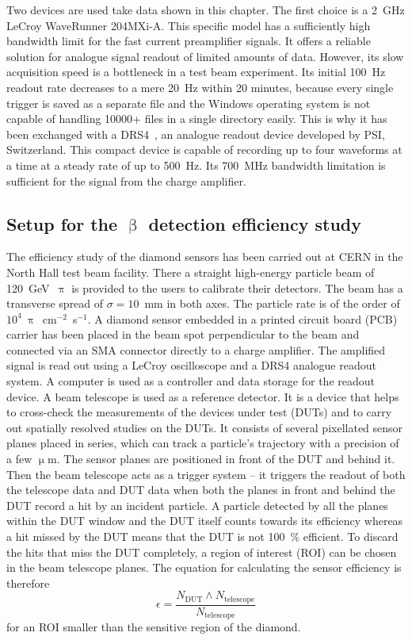 Two devices are used take data shown in this chapter. The first choice is a 2~GHz LeCroy WaveRunner 204MXi-A. This specific model has a sufficiently high bandwidth limit for the fast current preamplifier signals. It offers a reliable solution for analogue signal readout of limited amounts of data. However, its slow acquisition speed is a bottleneck in a test beam experiment. Its initial 100~Hz readout rate decreases to a mere 20~Hz within 20 minutes, because every single trigger is saved as a separate file and the Windows operating system is not capable of handling 10000+ files in a single directory easily. This is why it has been exchanged with a DRS4~\cite{DRS4:00000}, an analogue readout device developed by PSI, Switzerland. This compact device is capable of recording up to four waveforms at a time at a steady rate of up to 500~Hz. Its 700~MHz bandwidth limitation is sufficient for the signal from the charge amplifier.



\subsection{Setup for the $\upbeta$ detection efficiency study}
The efficiency study of the diamond sensors has been carried out at CERN in the North Hall test beam facility. There a straight high-energy particle beam of 120~GeV~$\uppi$ is provided to the users to calibrate their detectors. The beam has a transverse spread of $\sigma=10$~mm in both axes. The particle rate is of the order of $10^4~\uppi$~cm$^{-2}$~s$^{-1}$. A diamond sensor embedded in a printed circuit board (PCB) carrier has been placed in the beam spot perpendicular to the beam and connected via an SMA connector directly to a charge amplifier. The amplified signal is read out using a LeCroy oscilloscope and a DRS4 analogue readout system. A computer is used as a controller and data storage for the readout device. A beam telescope is used as a reference detector. It is a device that helps to cross-check the measurements of the devices under test (DUTs) and to carry out spatially resolved studies on the DUTs. It consists of several pixellated sensor planes placed in series, which can track a particle's trajectory with a precision of a few $\upmu$m. The sensor planes are positioned in front of the DUT and behind it. Then the beam telescope acts as a trigger system -- it triggers the readout of both the telescope data and DUT data when both the planes in front and behind the DUT record a hit by an incident particle. A particle detected by all the planes within the DUT window and the DUT itself counts towards its efficiency whereas a hit missed by the DUT means that the DUT is not 100~\% efficient. To discard the hits that miss the DUT completely, a region of interest (ROI) can be chosen in the beam telescope planes. The equation for calculating the sensor efficiency is therefore
\begin{equation}
\label{eq:sensoreff}
\epsilon = \frac{ N_\mathrm{DUT} \wedge N_\mathrm{telescope} }{ N_\mathrm{telescope} }
\end{equation}
for an ROI smaller than the sensitive region of the diamond.


